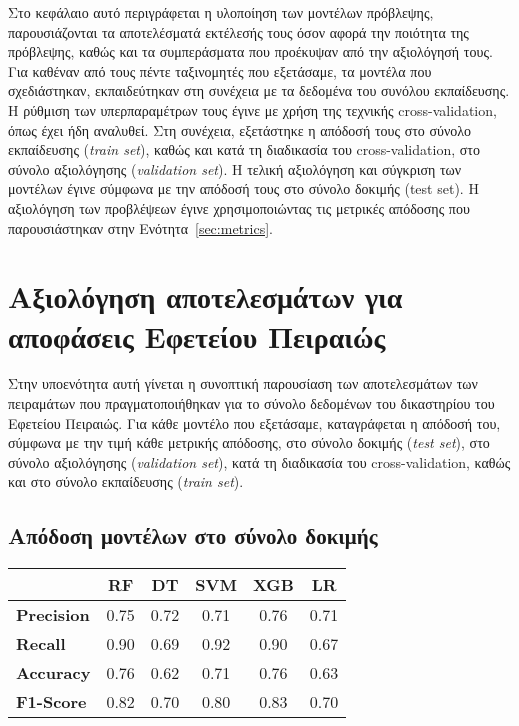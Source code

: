 \documentclass[diploma]{softlab-thesis}
\begin{document}
\begin{enumerate}
\begin{enumerate}
Στο κεφάλαιο αυτό περιγράφεται η υλοποίηση των μοντέλων πρόβλεψης, παρουσιάζονται τα αποτελέσματά εκτέλεσής τους όσον αφορά την ποιότητα της πρόβλεψης, καθώς και τα συμπεράσματα που προέκυψαν από την αξιολόγησή τους. Για καθέναν από τους πέντε ταξινομητές που εξετάσαμε, τα μοντέλα που σχεδιάστηκαν, εκπαιδεύτηκαν στη συνέχεια με τα δεδομένα του συνόλου εκπαίδευσης. Η ρύθμιση των υπερπαραμέτρων τους έγινε με χρήση της τεχνικής cross-validation, όπως έχει ήδη αναλυθεί. Στη συνέχεια, εξετάστηκε η απόδοσή τους στο σύνολο εκπαίδευσης (\textit{train set}), καθώς και κατά τη διαδικασία του cross-validation, στο σύνολο αξιολόγησης (\textit{validation set}). Η τελική αξιολόγηση και σύγκριση των μοντέλων έγινε σύμφωνα με την απόδοσή τους στο σύνολο δοκιμής (test set). Η αξιολόγηση των προβλέψεων έγινε χρησιμοποιώντας τις μετρικές απόδοσης που παρουσιάστηκαν στην Ενότητα~\ref{sec:metrics}.

\section{Αξιολόγηση αποτελεσμάτων για αποφάσεις Εφετείου Πειραιώς}

Στην υποενότητα αυτή γίνεται η συνοπτική παρουσίαση των αποτελεσμάτων των πειραμάτων που πραγματοποιήθηκαν για το σύνολο δεδομένων του δικαστηρίου του Εφετείου Πειραιώς. Για κάθε μοντέλο που εξετάσαμε, καταγράφεται η απόδοσή του, σύμφωνα με την τιμή κάθε μετρικής απόδοσης, στο σύνολο δοκιμής (\textit{test set}), στο σύνολο αξιολόγησης (\textit{validation set}), κατά τη διαδικασία του cross-validation, καθώς και στο σύνολο εκπαίδευσης (\textit{train set}).


\subsection{Απόδοση μοντέλων στο σύνολο δοκιμής}

\begin{table}[H]
\centering
\begin{tabular}{|l|c|c|c|c|c|}
\hline
       & \textbf{RF} & \textbf{DT} & \textbf{SVM} & \textbf{XGB} & \textbf{LR} \\ \hline
\textbf{Precision} & 0.75        & 0.72        & 0.71         & 0.76         & 0.71        \\ \hline
\textbf{Recall}    & 0.90        & 0.69        & 0.92         & 0.90         & 0.67       \\ \hline
\textbf{Accuracy}  & 0.76        & 0.62        & 0.71         & 0.76         & 0.63        \\ \hline
\textbf{F1-Score}  & 0.82        & 0.70        & 0.80         & 0.83         & 0.70      \\ \hline
\end{tabular}
\end{table}


\end{enumerate}
\end{enumerate}
\end{document}
